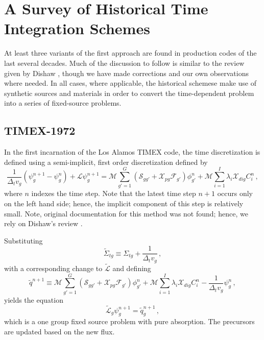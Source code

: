 \section{A Survey of Historical Time Integration Schemes}

At least three variants of the first approach are found in
production codes of the last several decades.  Much of 
the discussion to follow is similar to the review given
by Dishaw \cite{dishaw2007tdd}, though we have made 
corrections and our own observations where
needed.  In all cases, where applicable, the historical 
schemese make use of synthetic sources and materials in order 
to convert the time-dependent problem into 
a series of fixed-source problems.

\subsection{TIMEX-1972}

In the first incarnation of the Los Alamos TIMEX code, the time 
discretization is defined using a semi-implicit,
first order discretization defined by
\begin{equation}
  \frac{1}{\Delta_t v_g} \left ( \psi^{n+1}_g - \psi^{n}_g \right )
     + \mathcal{L}\psi^{n+1}_g = 
       \mathcal{M} \sum_{g'=1}^G 
         \left (
           \mathcal{S}_{gg'} + 
           \mathcal{X}_{pg} \mathcal{F}_{g'} 
         \right )\phi^{n}_{g'}
     +  \mathcal{M} \sum_{i=1}^{I} \lambda_i \mathcal{X}_{dig} C^{n}_i \, ,
\label{eq:timex1972}
\end{equation}
where $n$ indexes the time step.  Note that the latest time
step $n+1$ occurs only on the left hand side; hence, the 
implicit component of this step is relatively small.  Note,
original documentation for this method was not found; hence, 
we rely on Dishaw's review \cite{dishaw2007tdd}.

Substituting
\begin{equation}
 \tilde{\Sigma}_{tg} \equiv \Sigma_{tg} + \frac{1}{\Delta_t v_g} \, ,
\end{equation}
with a corresponding change to $\tilde{\mathcal{L}}$ and defining
\begin{equation}
 \tilde{q}^{n+1} \equiv
     \mathcal{M} \sum_{g'=1}^G 
         \left (
           \mathcal{S}_{gg'} + 
           \mathcal{X}_{pg} \mathcal{F}_{g'} 
         \right )\phi^{n}_{g'}
     +  \mathcal{M} \sum_{i=1}^{I} \lambda_i \mathcal{X}_{dig} C^{n}_i
     - \frac{1}{\Delta_t v_g} \psi^{n}_g \, ,
\end{equation}
yields the equation
\begin{equation}
  \tilde{\mathcal{L}}_g\psi^{n+1}_g = \tilde{q}^{n+1}_g \, ,
\end{equation}
which is a one group fixed source 
problem with pure absorption.  The precursors are 
updated based on the new flux.


